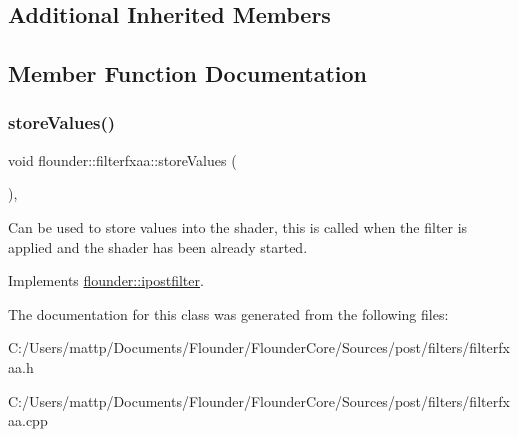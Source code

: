 \subsection*{Additional Inherited Members}


\subsection{Member Function Documentation}
\mbox{\label{classflounder_1_1filterfxaa_abee255cfd538d96881386157e6e8eea0}} 
\subsubsection{\texorpdfstring{store\+Values()}{storeValues()}}
{\footnotesize\ttfamily void flounder\+::filterfxaa\+::store\+Values (\begin{DoxyParamCaption}{ }\end{DoxyParamCaption})\hspace{0.3cm}{\ttfamily [override]}, {\ttfamily [virtual]}}



Can be used to store values into the shader, this is called when the filter is applied and the shader has been already started. 



Implements \hyperlink{classflounder_1_1ipostfilter_a9b658b4672718d5ac36539875bde722e}{flounder\+::ipostfilter}.



The documentation for this class was generated from the following files\+:\begin{DoxyCompactItemize}
\item 
C\+:/\+Users/mattp/\+Documents/\+Flounder/\+Flounder\+Core/\+Sources/post/filters/filterfxaa.\+h\item 
C\+:/\+Users/mattp/\+Documents/\+Flounder/\+Flounder\+Core/\+Sources/post/filters/filterfxaa.\+cpp\end{DoxyCompactItemize}
